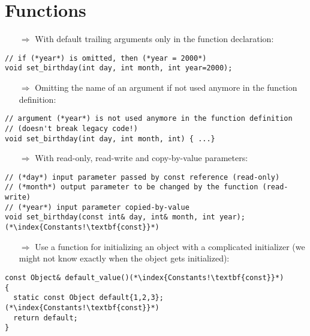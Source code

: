 \documentclass[10pt]{article}
\begin{document}
\section{Functions}
\small
\begin{enumerate}
\item[$\Rightarrow$] With default trailing arguments only in the function declaration:
\end{enumerate}
\begin{lstlisting}
// if (*year*) is omitted, then (*year = 2000*)
void set_birthday(int day, int month, int year=2000);
\end{lstlisting}
\begin{enumerate}
\item[$\Rightarrow$] Omitting the name of an argument if not used anymore in the function definition:
\end{enumerate}
\begin{lstlisting}
// argument (*year*) is not used anymore in the function definition
// (doesn't break legacy code!)
void set_birthday(int day, int month, int) { ...}
\end{lstlisting}
\begin{enumerate}
\item[$\Rightarrow$] With read-only, read-write and copy-by-value parameters:
\end{enumerate}
\begin{lstlisting}
// (*day*) input parameter passed by const reference (read-only)
// (*month*) output parameter to be changed by the function (read-write)
// (*year*) input parameter copied-by-value
void set_birthday(const int& day, int& month, int year);(*\index{Constants!\textbf{const}}*)
\end{lstlisting}
\begin{enumerate}
\item[$\Rightarrow$] Use a function for initializing an object with a complicated initializer (we might not
know exactly when the object gets initialized):
\end{enumerate}
\begin{lstlisting}
const Object& default_value()(*\index{Constants!\textbf{const}}*)
{
  static const Object default{1,2,3};(*\index{Constants!\textbf{const}}*)
  return default;
}
\end{lstlisting}
\end{document}
